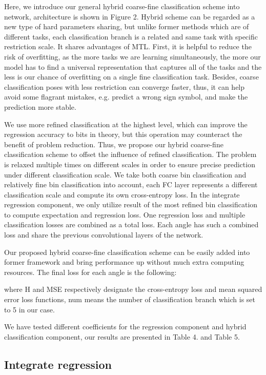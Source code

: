 \documentclass{article}
\begin{document}
\begin{CJK*}{UTF8}{gkai}
Here, we introduce our general hybrid coarse-fine classification scheme into network, architecture is shown in Figure 2. Hybrid scheme can be regarded as a new type of hard parameters sharing, but unlike former methods which are of different tasks, each classification branch is a related and same task with specific restriction scale. It shares advantages of MTL. First, it is helpful to reduce the risk of overfitting, as the more tasks we are learning simultaneously, the more our model has to find a universal representation that captures all of the tasks and the less is our chance of overfitting on a single fine classification task. Besides, coarse classification poses with less restriction can converge faster, thus, it can help avoid some flagrant mistakes, e.g. predict a wrong sign symbol, and make the prediction more stable.
 
We use more refined classification at the highest level, which can improve the regression accuracy to bits in theory, but this operation may counteract the benefit of problem reduction. Thus, we propose our hybrid coarse-fine classification scheme to offset the influence of refined classification. The problem is relaxed multiple times on different scales in order to ensure precise prediction under different classification scale. We take both coarse bin classification and relatively fine bin classification into account, each FC layer represents a different classification scale and compute its own cross-entropy loss. In the integrate regression component, we only utilize result of the most refined bin classification to compute expectation and regression loss. One regression loss and multiple classification losses are combined as a total loss. Each angle has such a combined loss and share the previous convolutional layers of the network.

Our proposed hybrid coarse-fine classification scheme can be easily added into former framework and bring performance up without much extra computing resources. The final loss for each angle is the following:



where H and MSE respectively designate the cross-entropy loss and mean squared error loss functions, num means the number of classification branch which is set to 5 in our case.

We have tested different coefficients for the regression component and hybrid classification component, our results are presented in Table 4. and Table 5.

\subsection{Integrate regression}
\label{ssec:subhead}


\end{CJK*}
\end{document}
